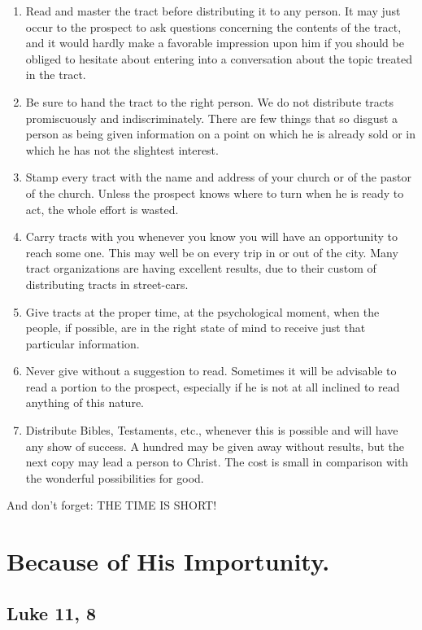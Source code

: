 \documentclass[
]{book}
\begin{document}
\begin{enumerate}
\def\labelenumi{\arabic{enumi}.}
\item
  Read and master the tract before distributing it to any person. It may just occur to the prospect to ask questions concerning the contents of the tract, and it would hardly make a favorable impression upon him if you should be obliged to hesitate about entering into a conversation about the topic treated in the tract.
\item
  Be sure to hand the tract to the right person. We do not distribute tracts promiscuously and indiscriminately. There are few things that so disgust a person as being given information on a point on which he is already sold or in which he has not the slightest interest.
\item
  Stamp every tract with the name and address of your church or of the pastor of the church. Unless the prospect knows where to turn when he is ready to act, the whole effort is wasted.
\item
  Carry tracts with you whenever you know you will have an opportunity to reach some one. This may well be on every trip in or out of the city. Many tract organizations are having excellent results, due to their custom of distributing tracts in street-cars.
\item
  Give tracts at the proper time, at the psychological moment, when the people, if possible, are in the right state of mind to receive just that particular information.
\item
  Never give without a suggestion to read. Sometimes it will be advisable to read a portion to the prospect, especially if he is not at all inclined to read anything of this nature.
\item
  Distribute Bibles, Testaments, etc., whenever this is possible and will have any show of success. A hundred may be given away without results, but the next copy may lead a person to Christ. The cost is small in comparison with the wonderful possibilities for good.
\end{enumerate}

And don't forget: THE TIME IS SHORT!

\chapter{Because of His Importunity.}\label{because-of-his-importunity.}

\section*{Luke 11, 8}\label{luke-11-8}
\end{document}
